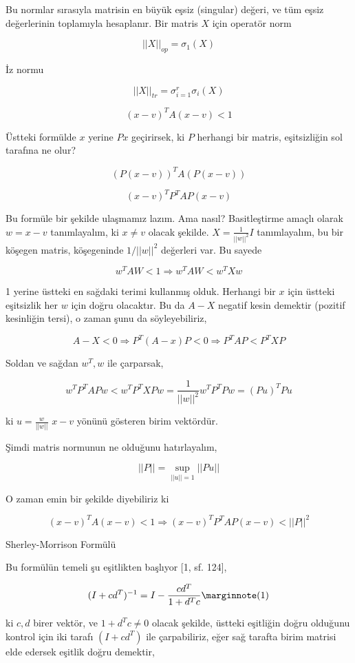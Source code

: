 \documentclass[12pt,fleqn]{article}\usepackage{../../common}
\begin{document}
Bu normlar sırasıyla matrisin en büyük eşsiz (singular) değeri, ve tüm
eşsiz değerlerinin toplamıyla hesaplanır. Bir matris $X$ için operatör norm

$$
||X||_{op} = \sigma_1(X)
$$

İz normu

$$
||X||_{tr} = \sigma _{i=1}^{r} \sigma_i(X)
$$


\newpage

$$ (x-v)^TA(x-v) < 1 $$

Üstteki formülde $x$ yerine $Px$ geçirirsek, ki $P$ herhangi bir matris,
eşitsizliğin sol tarafına ne olur?

$$ (P(x-v))^T A (P(x-v))$$

$$ (x-v)^T P^T A P (x-v)  $$

Bu formüle bir şekilde ulaşmamız lazım. Ama nasıl? Basitleştirme amaçlı olarak
$w = x-v$ tanımlayalım, ki $x \ne v$ olacak şekilde. $X = \frac{1}{||w||^2} I$
tanımlayalım, bu bir köşegen matris, köşegeninde $1/||w||^2$ değerleri var. Bu
sayede

$$ w^T A W < 1  \Rightarrow w^T A W < w^T X w  $$

1 yerine üstteki en sağdaki terimi kullanmış olduk. Herhangi bir $x$ için
üstteki eşitsizlik her $w$ için doğru olacaktır. Bu da $A - X$ negatif kesin
demektir (pozitif kesinliğin tersi), o zaman şunu da söyleyebiliriz,

$$ A - X < 0 \Rightarrow P^T(A-x)P < 0 \Rightarrow P^T AP < P^TXP $$

Soldan ve sağdan $w^T,w$ ile çarparsak,

$$ w^T P^T AP w < w^T P^TXP w = \frac{1}{||w||^2} w^T P^T P w = (Pu)^T Pu$$

ki $u = \frac{w}{||w||}$ $x-v$ yönünü gösteren birim vektördür. 

Şimdi matris normunun ne olduğunu hatırlayalım,

$$ ||P|| = \sup_{||u||=1} || Pu || $$

O zaman emin bir şekilde diyebiliriz ki 

$$ (x-v)^TA(x-v) < 1 \Rightarrow (x-v)^T P^T A P (x-v) < ||P||^2 $$


\newpage 

Sherley-Morrison Formülü

Bu formülün temeli şu eşitlikten başlıyor [1, sf. 124],

$$
(I+cd^T)^{-1} = I - \frac{cd^T}{1+d^Tc}
\mlabel{1}
$$

ki $c,d$ birer vektör, ve $1+d^Tc \ne 0$ olacak şekilde, üstteki eşitliğin
doğru olduğunu kontrol için iki tarafı $(I+cd^T)$ ile çarpabiliriz, eğer
sağ tarafta birim matrisi elde edersek eşitlik doğru demektir,
\end{document}
